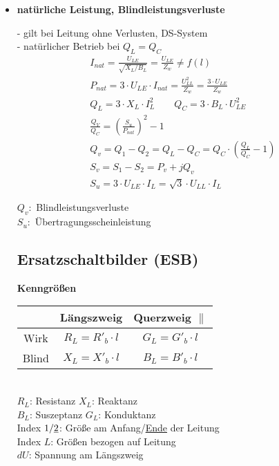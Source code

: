 \begin{itemize}
    \item[] \textbf{natürliche Leistung, Blindleistungsverluste}

        - gilt bei Leitung ohne Verlusten, DS-System\\
        - natürlicher Betrieb bei $Q_L = Q_C$
        \begin{gather*}
            I_{nat} = \frac{U_{LE}}{\sqrt{X_L/B_L}} =  \frac{U_{LE}}{Z_w} \neq f(l)\\
            P_{nat} = 3 \cdot U_{LE} \cdot I_{nat} = \frac{U^2_{LL}}{Z_w} = \frac{3 \cdot U_{LE}}{Z_w}\\
            Q_L = 3 \cdot X_L \cdot I_L^2 \qquad Q_C = 3 \cdot B_L \cdot U^2_{LE}\\
            \frac{Q_V}{Q_C} = \left(\frac{S_u}{P_{nat}} \right)^2-1\\
            Q_v = Q_1 - Q_2 = Q_L - Q_C = Q_C \cdot (\frac{Q_L}{Q_C}-1)\\
            S_v = S_1 - S_2 = P_v + j Q_v\\
            S_u = 3 \cdot U_{LE} \cdot I_L = \sqrt{3} \cdot U_{LL} \cdot I_L
        \end{gather*}

        \indent $Q_v:$ Blindleistungsverluste\\
        \indent $S_u:$ Übertragungsscheinleistung

\subsection{Ersatzschaltbilder (ESB)}

\textbf{Kenngrößen}\\

\begin{tabular}[h]{c|c|c}
    & Längszweig & Querzweig $\parallel$ \\
    \hline
    Wirk & $R_L = R'_b \cdot l$ & $G_L= G'_b \cdot l$\\
    Blind & $X_L = X'_b \cdot l$ & $B_L = B'_b \cdot l$\\
\end{tabular}\\

$R_L$: Resistanz \qquad $X_L$: Reaktanz\\
$B_L$: Suszeptanz \qquad $G_L$: Konduktanz\\

Index $1/\underline{2}$: Größe am Anfang/\ul{Ende} der Leitung\\
Index $L$: Größen bezogen auf Leitung\\
$dU$: Spannung am Längszweig\\


\end{itemize}
